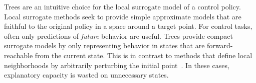 \documentclass[letterpaper]{article} %
\begin{document}
Trees are an intuitive choice for the local surrogate model of a control policy. 
Local surrogate methods seek to provide simple approximate models that are faithful to the original policy in a space around a target point. 
For control tasks, often only predictions of \emph{future} behavior are useful. 
Trees provide compact surrogate models by only representing behavior in states that are forward-reachable from the current state. 
This is in contrast to methods that define local neighborhoods by arbitrarily perturbing the initial point~\cite{ribeiro2016}.
In these cases, explanatory capacity is wasted on unnecessary states. 
\end{document}
